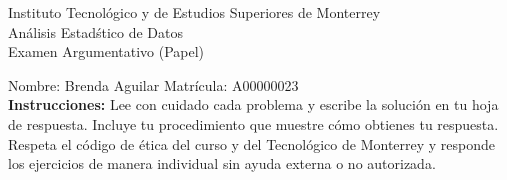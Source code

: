 \documentclass[10pt]{report}
\begin{document}
\newpage



\begin{center}
{\large Instituto Tecnol\'{o}gico y de Estudios Superiores de Monterrey \\
An\'alisis Estad\'stico de Datos } \\
Examen Argumentativo (Papel)
\end{center}

Nombre: \underline{\hspace*{.2in}}
Brenda Aguilar
\underline{\hspace*{.2in}} \quad Matr\'icula:\underline{\hspace*{.2in}}
A00000023
\underline{\hspace*{.2in}} \\

{\bf Instrucciones:} Lee con cuidado cada problema y escribe la soluci\'on
en tu hoja de respuesta. Incluye tu procedimiento que muestre c\'omo obtienes tu respuesta.  Respeta el c\'odigo de \'etica del curso y del Tecnol\'ogico de Monterrey y responde los ejercicios de manera individual sin ayuda externa o no autorizada.
\end{document}
